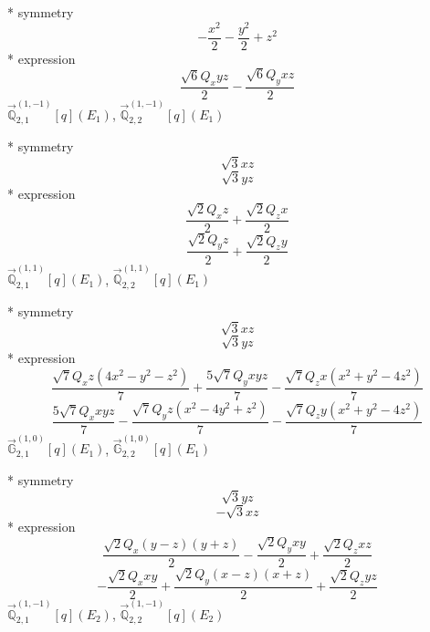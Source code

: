 \documentclass[fleqn,8pt]{jsarticle}
\begin{document}
\noindent\quad ** symmetry
\begin{dmath*}
- \frac{x^{2}}{2} - \frac{y^{2}}{2} + z^{2}
\end{dmath*}
\noindent\quad ** expression
\begin{dmath*}
\frac{\sqrt{6} Q_{x} y z}{2} - \frac{\sqrt{6} Q_{y} x z}{2}
\end{dmath*}
\noindent\quad $\vec{\mathbb{Q}}_{2,1}^{(1,-1)}[q](E_{1})$, $\vec{\mathbb{Q}}_{2,2}^{(1,-1)}[q](E_{1})$

\noindent\quad ** symmetry
\begin{dmath*}
\sqrt{3} x z
\end{dmath*}
\begin{dmath*}
\sqrt{3} y z
\end{dmath*}
\noindent\quad ** expression
\begin{dmath*}
\frac{\sqrt{2} Q_{x} z}{2} + \frac{\sqrt{2} Q_{z} x}{2}
\end{dmath*}
\begin{dmath*}
\frac{\sqrt{2} Q_{y} z}{2} + \frac{\sqrt{2} Q_{z} y}{2}
\end{dmath*}
\noindent\quad $\vec{\mathbb{Q}}_{2,1}^{(1,1)}[q](E_{1})$, $\vec{\mathbb{Q}}_{2,2}^{(1,1)}[q](E_{1})$

\noindent\quad ** symmetry
\begin{dmath*}
\sqrt{3} x z
\end{dmath*}
\begin{dmath*}
\sqrt{3} y z
\end{dmath*}
\noindent\quad ** expression
\begin{dmath*}
\frac{\sqrt{7} Q_{x} z \left(4 x^{2} - y^{2} - z^{2}\right)}{7} + \frac{5 \sqrt{7} Q_{y} x y z}{7} - \frac{\sqrt{7} Q_{z} x \left(x^{2} + y^{2} - 4 z^{2}\right)}{7}
\end{dmath*}
\begin{dmath*}
\frac{5 \sqrt{7} Q_{x} x y z}{7} - \frac{\sqrt{7} Q_{y} z \left(x^{2} - 4 y^{2} + z^{2}\right)}{7} - \frac{\sqrt{7} Q_{z} y \left(x^{2} + y^{2} - 4 z^{2}\right)}{7}
\end{dmath*}
\noindent\quad $\vec{\mathbb{G}}_{2,1}^{(1,0)}[q](E_{1})$, $\vec{\mathbb{G}}_{2,2}^{(1,0)}[q](E_{1})$

\noindent\quad ** symmetry
\begin{dmath*}
\sqrt{3} y z
\end{dmath*}
\begin{dmath*}
- \sqrt{3} x z
\end{dmath*}
\noindent\quad ** expression
\begin{dmath*}
\frac{\sqrt{2} Q_{x} \left(y - z\right) \left(y + z\right)}{2} - \frac{\sqrt{2} Q_{y} x y}{2} + \frac{\sqrt{2} Q_{z} x z}{2}
\end{dmath*}
\begin{dmath*}
- \frac{\sqrt{2} Q_{x} x y}{2} + \frac{\sqrt{2} Q_{y} \left(x - z\right) \left(x + z\right)}{2} + \frac{\sqrt{2} Q_{z} y z}{2}
\end{dmath*}
\noindent\quad $\vec{\mathbb{Q}}_{2,1}^{(1,-1)}[q](E_{2})$, $\vec{\mathbb{Q}}_{2,2}^{(1,-1)}[q](E_{2})$
\end{document}
